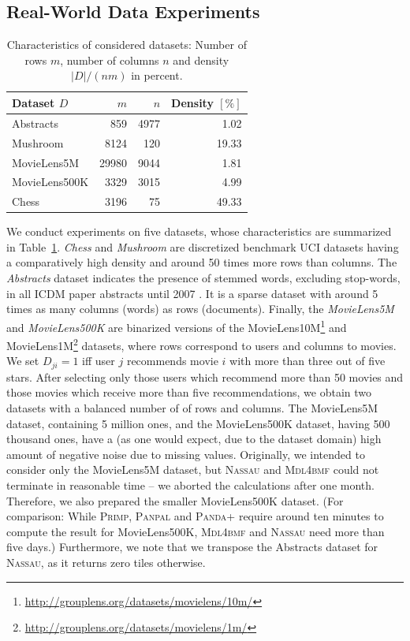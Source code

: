 \subsection{Real-World Data Experiments}\label{sec:MDL:RealWorld}
\begin{table} 
	\centering
	\begin{tabular}{lrrr}\toprule
    Dataset $D$ & $m$ & $n$ & Density $[\%]$\\ 
    \midrule
    Abstracts & 859 & 4977 & 1.02\\
    Mushroom & 8124 & 120 & 19.33\\
    MovieLens5M & 29980 &9044 &1.81\\
    MovieLens500K &3329 & 3015 & 4.99\\
    Chess & 3196 & 75 &49.33\\ \bottomrule
    \end{tabular}
    \caption{Characteristics of considered datasets: Number of rows $m$, number of columns $n$ and density $|D|/(nm)$ in percent.}
    \label{tbl:dataStats}
\end{table}
We conduct experiments on five datasets, whose characteristics are summarized in Table~\ref{tbl:dataStats}. \emph{Chess} and \emph{Mushroom} are discretized benchmark UCI datasets having a comparatively high density and around 50 times more rows than columns. The \emph{Abstracts} dataset indicates the presence of stemmed words, excluding stop-words, in all ICDM paper abstracts until 2007 \citep{deBie2011maximum}. It is a sparse dataset with around 5 times as many columns (words) as rows (documents). Finally, the \emph{MovieLens5M} and \emph{MovieLens500K} are binarized versions of the MovieLens10M\footnote{\url{http://grouplens.org/datasets/movielens/10m/}} and MovieLens1M\footnote{\url{http://grouplens.org/datasets/movielens/1m/}} datasets, where rows correspond to users and columns to movies. We set $D_{ji}=1$ iff user $j$ recommends movie $i$ with more than three out of five stars. After selecting only those users which recommend more than 50 movies and those movies which receive more than five recommendations, we obtain two datasets with a balanced number of of rows and columns. The MovieLens5M dataset, containing 5 million ones, and the MovieLens500K dataset, having 500 thousand ones, have a (as one would expect, due to the dataset domain) high amount of negative noise due to missing values. Originally, we intended to consider only the MovieLens5M dataset, but \textsc{Nassau} and \textsc{Mdl4bmf} could not terminate in reasonable time -- we aborted the calculations after one month. Therefore, we also prepared the smaller MovieLens500K dataset. (For comparison: While \textsc{Primp}, \textsc{Panpal} and \textsc{Panda+} require around ten minutes to compute the result for MovieLens500K, \textsc{Mdl4bmf} and \textsc{Nassau} need more than five days.)  Furthermore, we note that we transpose the Abstracts dataset for \textsc{Nassau}, as it returns zero tiles otherwise.

